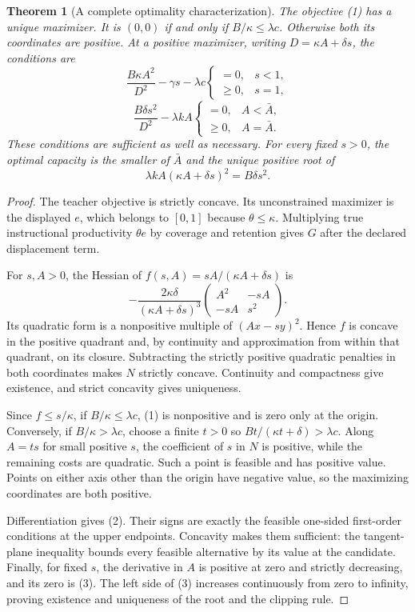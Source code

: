 \documentclass[11pt,a4paper]{article}
\newtheorem{theorem}{Theorem}[section]
\theoremstyle{remark}
\begin{document}
\begin{theorem}[A complete optimality characterization]
The objective (1) has a unique maximizer. It is $(0,0)$ if and only if $B/\kappa\le\lambda c$. Otherwise both its coordinates are positive. At a positive maximizer, writing $D=\kappa A+\delta s$, the conditions are
\[
 \frac{B\kappa A^2}{D^2}-\gamma s-\lambda c
 \begin{cases}=0,&s<1,\\\ge0,&s=1,\end{cases}
\]
\[
 \frac{B\delta s^2}{D^2}-\lambda kA
 \begin{cases}=0,&A<\bar A,\\\ge0,&A=\bar A.\end{cases} \tag{2}
\]
These conditions are sufficient as well as necessary. For every fixed $s>0$, the optimal capacity is the smaller of $\bar A$ and the unique positive root of
\[
 \lambda kA(\kappa A+\delta s)^2=B\delta s^2. \tag{3}
\]
\end{theorem}
\begin{proof}
The teacher objective is strictly concave. Its unconstrained maximizer is the displayed $e$, which belongs to $[0,1]$ because $\theta\le\kappa$. Multiplying true instructional productivity $\theta e$ by coverage and retention gives $G$ after the declared displacement term.

For $s,A>0$, the Hessian of $f(s,A)=sA/(\kappa A+\delta s)$ is
\[
 -\frac{2\kappa\delta}{(\kappa A+\delta s)^3}
 \begin{pmatrix}A^2&-sA\\-sA&s^2\end{pmatrix}.
\]
Its quadratic form is a nonpositive multiple of $(Ax-sy)^2$. Hence $f$ is concave in the positive quadrant and, by continuity and approximation from within that quadrant, on its closure. Subtracting the strictly positive quadratic penalties in both coordinates makes $N$ strictly concave. Continuity and compactness give existence, and strict concavity gives uniqueness.

Since $f\le s/\kappa$, if $B/\kappa\le\lambda c$, (1) is nonpositive and is zero only at the origin. Conversely, if $B/\kappa>\lambda c$, choose a finite $t>0$ so $Bt/(\kappa t+\delta)>\lambda c$. Along $A=ts$ for small positive $s$, the coefficient of $s$ in $N$ is positive, while the remaining costs are quadratic. Such a point is feasible and has positive value. Points on either axis other than the origin have negative value, so the maximizing coordinates are both positive.

Differentiation gives (2). Their signs are exactly the feasible one-sided first-order conditions at the upper endpoints. Concavity makes them sufficient: the tangent-plane inequality bounds every feasible alternative by its value at the candidate. Finally, for fixed $s$, the derivative in $A$ is positive at zero and strictly decreasing, and its zero is (3). The left side of (3) increases continuously from zero to infinity, proving existence and uniqueness of the root and the clipping rule.
\end{proof}
\end{document}
